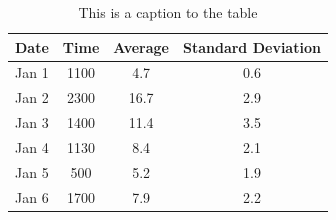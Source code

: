 \begin{table}[ht!]
\begin{center}
\begin{tabular}{lccc} 
	\toprule
	Date & Time  &  Average   & Standard Deviation \\ 
	\midrule
	Jan 1  & 1100	& 4.7		& 0.6		\\
	Jan 2  & 2300	& 16.7	& 2.9		\\
	Jan 3  & 1400	& 11.4	& 3.5		\\
	Jan 4  & 1130	& 8.4		& 2.1		\\
	Jan 5  & 500	& 5.2		& 1.9		\\
	Jan 6  & 1700	& 7.9		& 2.2		\\
	\bottomrule 
\end{tabular} 
\caption{This is a caption to the table}
\label{tab:1} 
\end{center}
\end{table} %
